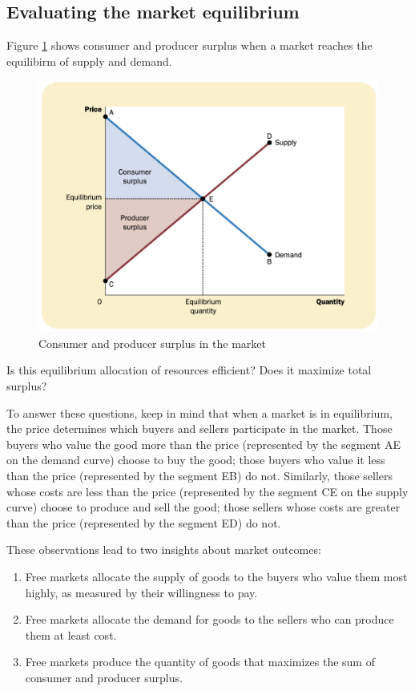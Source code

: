 \subsection{Evaluating the market equilibrium}

Figure \ref{fig:market-equilibrium} shows consumer and producer surplus when a market reaches the equilibirm of supply and demand.

\begin{figure}[!ht]
  \centering
  \includegraphics[width=\textwidth]{pics/market-equilibrium}
  \caption[Surplus in market]{Consumer and producer surplus in the market}
  \label{fig:market-equilibrium}
\end{figure}

Is this equilibrium allocation of resources efficient?
Does it maximize total surplus?

To answer these questions, keep in mind that
when a market is in equilibrium, the price determines which buyers and sellers participate in the market.
Those buyers who value the good more than the price (represented by the segment AE on the demand curve) choose to buy the good;
those buyers who value it less than the price (represented by the segment EB) do not.
Similarly, those sellers whose costs are less than the price (represented by the segment CE on the supply curve) choose to produce and sell the good;
those sellers whose costs are greater than the price (represented by the segment ED) do not.



These observations lead to two insights about market outcomes:
\begin{enumerate}
\item Free markets allocate the supply of goods to the buyers who value them most highly, as measured by their willingness to pay.
\item Free markets allocate the demand for goods to the sellers who can produce them at least cost.
\item Free markets produce the quantity of goods that maximizes the sum of consumer and producer surplus.
\end{enumerate}


